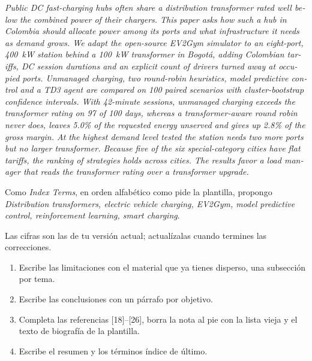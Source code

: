 \documentclass[11pt]{article}
\newenvironment{eng}{\begin{otherlanguage}{english}\itshape}{\end{otherlanguage}}
\begin{document}
\begin{ejemplo}
\begin{eng}
Public DC fast-charging hubs often share a distribution transformer rated well below the combined power of their chargers. This paper asks how such a hub in Colombia should allocate power among its ports and what infrastructure it needs as demand grows. We adapt the open-source EV2Gym simulator to an eight-port, 400~kW station behind a 100~kW transformer in Bogotá, adding Colombian tariffs, DC session durations and an explicit count of drivers turned away at occupied ports. Unmanaged charging, two round-robin heuristics, model predictive control and a TD3 agent are compared on 100 paired scenarios with cluster-bootstrap confidence intervals. With 42-minute sessions, unmanaged charging exceeds the transformer rating on 97 of 100 days, whereas a transformer-aware round robin never does, leaves 5.0\% of the requested energy unserved and gives up 2.8\% of the gross margin. At the highest demand level tested the station needs two more ports but no larger transformer. Because five of the six special-category cities have flat tariffs, the ranking of strategies holds across cities. The results favor a load manager that reads the transformer rating over a transformer upgrade.
\end{eng}

\smallskip
Como \emph{Index Terms}, en orden alfabético como pide la plantilla, propongo \foreignlanguage{english}{\emph{Distribution transformers, electric vehicle charging, EV2Gym, model predictive control, reinforcement learning, smart charging}}.

\smallskip
Las cifras son las de tu versión actual; actualízalas cuando termines las correcciones.
\end{ejemplo}

\begin{tarea}
\begin{enumerate}
\item Escribe las limitaciones con el material que ya tienes disperso, una subsección por tema.
\item Escribe las conclusiones con un párrafo por objetivo.
\item Completa las referencias [18]--[26], borra la nota al pie con la lista vieja y el texto de biografía de la plantilla.
\item Escribe el resumen y los términos índice de último.
\end{enumerate}
\end{tarea}
\end{document}
